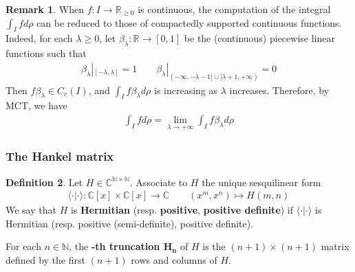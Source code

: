 \documentclass[12pt,b5paper,notitlepage]{article}
\theoremstyle{definition}
\newtheorem{df}{Definition}[subsection]
\newtheorem{eg}[df]{Example}
\newtheorem{rem}[df]{Remark}
\theoremstyle{plain}
\newcommand{\bk}[1]{\langle {#1}\rangle}
\newcommand{\Cbb}{\mathbb C}
\newcommand{\Nbb}{\mathbb N}
\newcommand{\Rbb}{\mathbb R}
\numberwithin{equation}{section}
\begin{document}
\begin{rem}\label{lb176}
When $f:I\rightarrow\Rbb_{\geq0}$ is continuous, the computation of the integral $\int_Ifd\rho$ can be reduced to those of compactedly supported continuous functions. Indeed, for each $\lambda\geq0$, let $\beta_\lambda:\Rbb\rightarrow[0,1]$ be the (continuous) piecewise linear functions such that
\begin{align*}
\beta_\lambda|_{[-\lambda,\lambda]}=1\qquad \beta_\lambda|_{(-\infty,-\lambda-1]\cup[\lambda+1,+\infty)}=0
\end{align*}
Then $f\beta_\lambda\in C_c(I)$, and $\int_I f\beta_\lambda d\rho$ is increasing as $\lambda$ increases. Therefore, by MCT, we have
\begin{align*}
\int_I fd\rho=\lim_{\lambda\rightarrow+\infty}\int_I f\beta_\lambda d\rho
\end{align*}
\end{rem}

\begin{comment}
\begin{eg}
If $I=[0,1]$, then $\int_I d\rho=\rho(1)$. If $I$ equals $\Rbb$ or $\Rbb_{\geq0}$, then
\begin{align*}
\int_I d\rho=\lim_{x\rightarrow+\infty}\rho(x)
\end{align*}
\end{eg}

\begin{proof}
When $I=[0,1]$, the definition of Stieltjes integral clearly imply $\int_Id\rho=\rho(1)$. Assume that $I$ is $\Rbb$ or $\Rbb_{\geq0}$. Recall from \eqref{eq42} that $\rho(x)=\mu(I_{\leq x})$, and hence
\begin{align*}
\lim_{x\rightarrow+\infty}\rho(x)=\lim_{x\rightarrow+\infty} \int_I \chi_{I_{\leq x}}d\rho=\int_Id\rho
\end{align*}
where the last equality is due to MCT.
\end{proof}
\end{comment}






\subsubsection{The Hankel matrix}


\begin{df}
Let $H\in\Cbb^{\Nbb\times\Nbb}$. Associate to $H$ the unique sesquilinear form
\begin{align*}
\bk{\cdot|\cdot}:\Cbb[x]\times\Cbb[x]\rightarrow\Cbb\qquad (x^m,x^n)\mapsto H(m,n)
\end{align*} 
We say that $H$ is \textbf{Hermitian} (resp. \textbf{positive}, \textbf{positive definite}) if $\bk{\cdot|\cdot}$ is Hermitian (resp. positive (semi-definite), positive definite). 

For each $n\in\Nbb$, the \textbf{-th truncation $\pmb{H_n}$} of $H$ is the $(n+1)\times(n+1)$ matrix defined by the first $(n+1)$ rows and columns of $H$. \hfill
\end{df}
\end{document}
